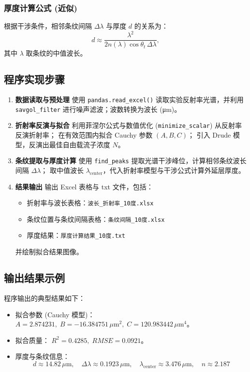\subsubsection{厚度计算公式 (近似)}
根据干涉条件，相邻条纹间隔 $\Delta \lambda$ 与厚度 $d$ 的关系为：
\begin{equation}
d \approx \frac{\lambda^2}{2 n(\lambda) \cos\theta_t \, \Delta \lambda},
\end{equation}
其中 $\lambda$ 取条纹的中值波长。

\subsection{程序实现步骤}

\begin{enumerate}
    \item \textbf{数据读取与预处理}  
    使用 \verb|pandas.read_excel()| 读取实验反射率光谱，并利用 \verb|savgol_filter| 进行噪声滤波；波数转换为波长 (μm)。

    \item \textbf{折射率反演与拟合}  
    利用菲涅尔公式与数值优化 (\verb|minimize_scalar|) 从反射率反演折射率；  
    在有效范围内拟合 Cauchy 参数 $(A, B, C)$；  
    引入 Drude 模型，反演出最佳自由载流子浓度 $N$。

    \item \textbf{条纹提取与厚度计算}  
    使用 \verb|find_peaks| 提取光谱干涉峰位，计算相邻条纹波长间隔 $\Delta \lambda$；  
    取中值波长 $\lambda_{\text{center}}$，代入折射率模型与干涉公式计算外延层厚度。

    \item \textbf{结果输出}  
    输出 Excel 表格与 txt 文件，包括：
    \begin{itemize}
        \item 折射率与波长表格：\verb|波长_折射率_10度.xlsx|
        \item 条纹位置与条纹间隔表格：\verb|条纹间隔_10度.xlsx|
        \item 厚度结果：\verb|厚度计算结果_10度.txt|
    \end{itemize}
    并绘制拟合结果图像。
\end{enumerate}

\subsection{输出结果示例}

程序输出的典型结果如下：
\begin{itemize}
    \item 拟合参数 (Cauchy 模型)：  
    $A = 2.874231,\; B = -16.384751 \,\mu\text{m}^2,\; C = 120.983442 \,\mu\text{m}^4$。
    \item 拟合质量：  
    $R^2 = 0.4285,\; RMSE = 0.0921$。
    \item 厚度与条纹信息：  
    \begin{equation*}
    d \approx 14.82 \,\mu\text{m}, \quad
    \Delta \lambda \approx 0.1923 \,\mu\text{m}, \quad
    \lambda_{\text{center}} \approx 3.476 \,\mu\text{m}, \quad
    n \approx 2.187
    \end{equation*}
\end{itemize}

